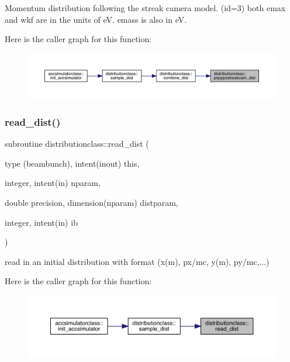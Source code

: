 Momentum distribution following the streak camera model. (id=3) both emax and wkf are in the units of eV. emass is also in eV. 

Here is the caller graph for this function\+:\nopagebreak
\begin{figure}[H]
\begin{center}
\leavevmode
\includegraphics[width=350pt]{namespacedistributionclass_a323470431d5dda05b3dd2ba27cf8565c_icgraph}
\end{center}
\end{figure}
\mbox{\label{namespacedistributionclass_adfcb2065e951ea9aa42c588f881e6021}} 
\subsubsection{\texorpdfstring{read\_dist()}{read\_dist()}}
{\footnotesize\ttfamily subroutine distributionclass\+::read\+\_\+dist (\begin{DoxyParamCaption}\item[{type (beambunch), intent(inout)}]{this,  }\item[{integer, intent(in)}]{nparam,  }\item[{double precision, dimension(nparam)}]{distparam,  }\item[{integer, intent(in)}]{ib }\end{DoxyParamCaption})}



read in an initial distribution with format (x(m), px/mc, y(m), py/mc,...) 

Here is the caller graph for this function\+:\nopagebreak
\begin{figure}[H]
\begin{center}
\leavevmode
\includegraphics[width=350pt]{namespacedistributionclass_adfcb2065e951ea9aa42c588f881e6021_icgraph}
\end{center}
\end{figure}
\mbox{\label{namespacedistributionclass_acf080fd52aac8287d955bcfd88362c07}} 
